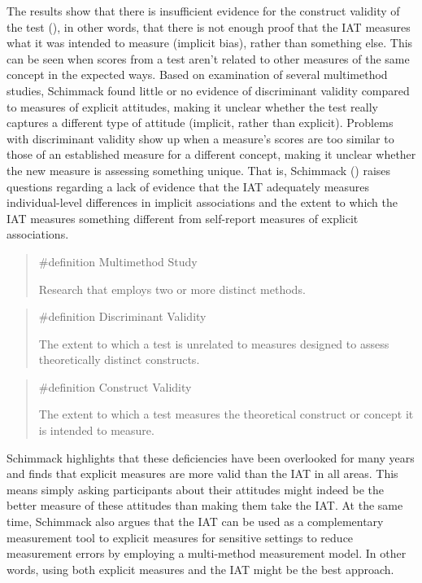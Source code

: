 \documentclass[
  letterpaper,
]{book}
\begin{document}
The results show that there is insufficient evidence for the construct
validity of the test (),
in other words, that there is not enough proof that the IAT measures
what it was intended to measure (implicit bias), rather than something
else. This can be seen when scores from a test aren't related to other
measures of the same concept in the expected ways. Based on examination
of several multimethod studies, Schimmack found little or no evidence of
discriminant validity compared to measures of explicit attitudes, making
it unclear whether the test really captures a different type of attitude
(implicit, rather than explicit). Problems with discriminant validity
show up when a measure's scores are too similar to those of an
established measure for a different concept, making it unclear whether
the new measure is assessing something unique. That is, Schimmack
() raises questions regarding a lack
of evidence that the IAT adequately measures individual-level
differences in implicit associations and the extent to which the IAT
measures something different from self-report measures of explicit
associations.

\begin{quote}
\label{def-multimethodstudy}{\#definition} Multimethod
Study

Research that employs two or more distinct methods.
\end{quote}

\begin{quote}
\label{def-discriminantvalidity}{\#definition}
Discriminant Validity

The extent to which a test is unrelated to measures designed to assess
theoretically distinct constructs.
\end{quote}

\begin{quote}
\label{def-constructvalidity}{\#definition} Construct
Validity

The extent to which a test measures the theoretical construct or concept
it is intended to measure.
\end{quote}

Schimmack highlights that these deficiencies have been overlooked for
many years and finds that explicit measures are more valid than the IAT
in all areas. This means simply asking participants about their
attitudes might indeed be the better measure of these attitudes than
making them take the IAT. At the same time, Schimmack also argues that
the IAT can be used as a complementary measurement tool to explicit
measures for sensitive settings to reduce measurement errors by
employing a multi-method measurement model. In other words, using both
explicit measures and the IAT might be the best approach.
\end{document}
